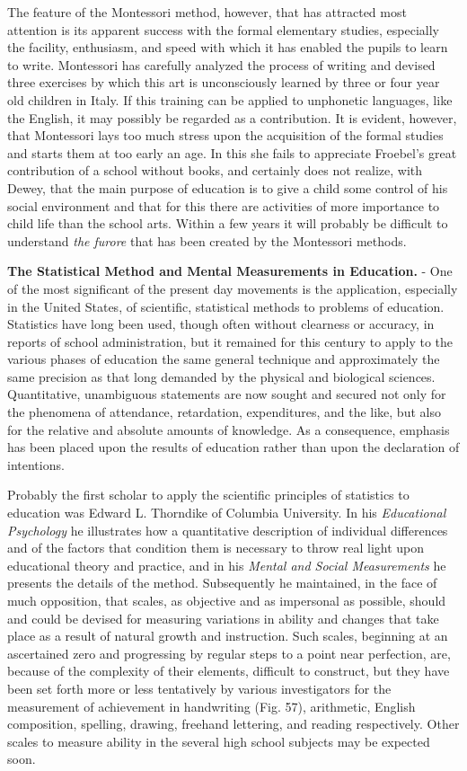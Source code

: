 \documentclass[
]{book}
\begin{document}
The feature of the Montessori method, however, that has attracted most attention is its apparent success with the formal elementary studies, especially the facility, enthusiasm, and speed with which it has enabled the pupils to learn to write. Montessori has carefully analyzed the process of writing and devised three exercises by which this art is unconsciously learned by three or four year old children in Italy. If this training can be applied to unphonetic languages, like the English, it may possibly be regarded as a contribution. It is evident, however, that Montessori lays too much stress upon the acquisition of the formal studies and starts them at too early an age. In this she fails to appreciate Froebel's great contribution of a school without books, and certainly does not realize, with Dewey, that the main purpose of education is to give a child some control of his social environment and that for this there are activities of more importance to child life than the school arts. Within a few years it will probably be difficult to understand \emph{the furore} that has been created by the Montessori methods.

\textbf{The Statistical Method and Mental Measurements in Education.} - One of the most significant of the present day movements is the application, especially in the United States, of scientific, statistical methods to problems of education. Statistics have long been used, though often without clearness or accuracy, in reports of school administration, but it remained for this century to apply to the various phases of education the same general technique and approximately the same precision as that long demanded by the physical and biological sciences. Quantitative, unambiguous statements are now sought and secured not only for the phenomena of attendance, retardation, expenditures, and the like, but also for the relative and absolute amounts of knowledge. As a consequence, emphasis has been placed upon the results of education rather than upon the declaration of intentions.

Probably the first scholar to apply the scientific principles of statistics to education was Edward L. Thorndike of Columbia University. In his \emph{Educational Psychology} he illustrates how a quantitative description of individual differences and of the factors that condition them is necessary to throw real light upon educational theory and practice, and in his \emph{Mental and Social Measurements} he presents the details of the method. Subsequently he maintained, in the face of much opposition, that scales, as objective and as impersonal as possible, should and could be devised for measuring variations in ability and changes that take place as a result of natural growth and instruction. Such scales, beginning at an ascertained zero and progressing by regular steps to a point near perfection, are, because of the complexity of their elements, difficult to construct, but they have been set forth more or less tentatively by various investigators for the measurement of achievement in handwriting (Fig. 57), arithmetic, English composition, spelling, drawing, freehand lettering, and reading respectively. Other scales to measure ability in the several high school subjects may be expected soon.
\end{document}
